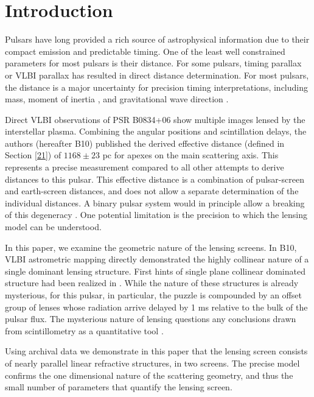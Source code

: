 \documentclass[useAMS,usenatbib]{mn2e}
\begin{document}
\section{Introduction}

Pulsars have long provided a rich source of astrophysical information
due to their compact emission and predictable timing. One of the
least well constrained parameters for most pulsars is their 
distance.  For some pulsars, timing parallax or VLBI parallax has
resulted in direct distance determination.  
For most pulsars, the
distance is a major uncertainty for precision timing interpretations,
including mass, moment of inertia \citep{2006Sci...314...97K,2012hpa..book.....L}, and
gravitational wave direction \citep{boyle2012}.

Direct VLBI observations of PSR B0834+06 show multiple images lensed
by the interstellar plasma.  
Combining the angular positions and
scintillation delays, the authors \citep{2010ApJ...708..232B} (hereafter B10) published the derived effective
distance (defined in Section \ref{21}) of $1168\pm 23$ pc
for apexes on the main scattering axis.
This represents a precise
measurement compared to all other attempts to derive distances to this
pulsar.  This effective distance is a combination of pulsar-screen and
earth-screen distances, and does not allow a separate determination of
the individual distances.  A binary pulsar system would in principle
allow a breaking of this degeneracy \citep{2014MNRAS.442.3338P}. One
potential limitation is the precision to which the lensing model can
be understood.  

In this paper, we examine the geometric nature of the lensing screens.
In B10, VLBI astrometric mapping directly demonstrated the highly
collinear nature of a single dominant lensing structure.  First hints
of single plane collinear dominated structure had been realized in
\citet{2001ApJ...549L..97S}.   While the nature of these structures
is already mysterious, for this pulsar, in particular, the puzzle is compounded by an offset group
of lenses whose radiation arrive delayed by 1 ms relative to the bulk of the pulsar flux.  The mysterious nature of
lensing questions any conclusions drawn from scintillometry as a
quantitative tool \citep{2014MNRAS.440L..36P}.


Using archival data we demonstrate in this paper that the lensing screen
consists of nearly parallel linear refractive structures, in two
screens.  The precise model confirms the one dimensional nature of the scattering geometry, and
thus the small number of parameters that
quantify the lensing screen. 
\end{document}
